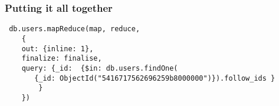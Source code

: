 \documentclass[10pt]{beamer}
\begin{document}
\begin{frame}[fragile]
  \frametitle{Putting it all together}

 \begin{verbatim}
 db.users.mapReduce(map, reduce,
    {
    out: {inline: 1},
    finalize: finalise,
    query: {_id:  {$in: db.users.findOne(
       {_id: ObjectId("5416717562696259b8000000")}).follow_ids }
        }
    })
 \end{verbatim}

\end{frame}
\end{document}

